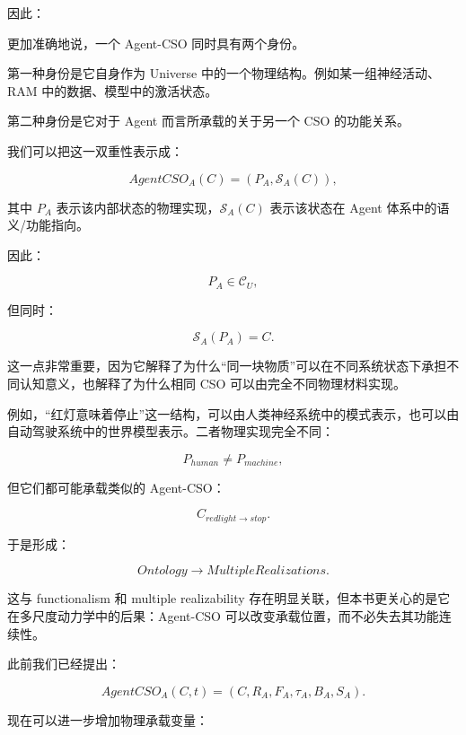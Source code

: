 因此：

\begin{statementbox}
\centering
{}
\end{statementbox}

更加准确地说，一个 Agent-CSO 同时具有两个身份。

第一种身份是它自身作为 Universe 中的一个物理结构。例如某一组神经活动、RAM 中的数据、模型中的激活状态。

第二种身份是它对于 Agent 而言所承载的关于另一个 CSO 的功能关系。

我们可以把这一双重性表示成：

\[
\boxed{
AgentCSO_A(C)
=
\left(
P_A,
\mathcal{S}_A(C)
\right),
}
\]

其中 $P_A$ 表示该内部状态的物理实现，$\mathcal{S}_A(C)$ 表示该状态在 Agent 体系中的语义/功能指向。

因此：

\[
P_A
\in
\mathcal{C}_{U},
\]

但同时：

\[
\mathcal{S}_A(P_A)
=
C.
\]

这一点非常重要，因为它解释了为什么“同一块物质”可以在不同系统状态下承担不同认知意义，也解释了为什么相同 CSO 可以由完全不同物理材料实现。

例如，“红灯意味着停止”这一结构，可以由人类神经系统中的模式表示，也可以由自动驾驶系统中的世界模型表示。二者物理实现完全不同：

\[
P_{human}
\neq
P_{machine},
\]

但它们都可能承载类似的 Agent-CSO：

\[
C_{redlight\rightarrow stop}.
\]

于是形成：

\[
Ontology
\rightarrow
MultipleRealizations.
\]

这与 functionalism 和 multiple realizability 存在明显关联，但本书更关心的是它在多尺度动力学中的后果：Agent-CSO 可以改变承载位置，而不必失去其功能连续性。

此前我们已经提出：

\[
AgentCSO_A(C,t)
=
(C,R_A,F_A,\tau_A,B_A,S_A).
\]

现在可以进一步增加物理承载变量：

\begin{statementbox}
\centering
{}
\end{statementbox}

